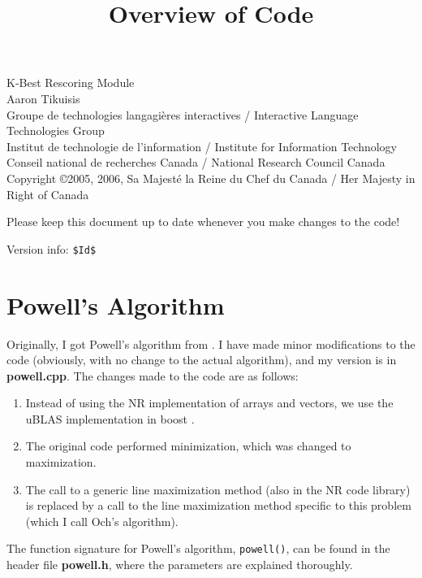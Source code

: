 \documentclass[12pt]{amsart}
\newcommand{\file}{\textbf} \newcommand{\url}{\underline}
\newcommand{\code}[1]{{\small \texttt{#1}}}
\begin{document}
\title{Overview of Code} \maketitle

{\tiny
  \noindent K-Best Rescoring Module\\ Aaron Tikuisis\\ Groupe de technologies
  langagi{\`e}res interactives / Interactive Language Technologies Group\\ Institut
  de technologie de l'information / Institute for Information Technology\\
  Conseil national de recherches Canada / National Research Council Canada\\
  Copyright \copyright 2005, 2006, Sa Majest{\'e} la Reine du Chef du Canada /
     Her Majesty in Right of Canada
}

\noindent
Please keep this document up to date whenever you make changes to the code!

{\tiny
\noindent
Version info: \verb+$Id$+
}
\\

\section*{Powell's Algorithm}

Originally, I got Powell's algorithm from \cite{NR-C++}.  I have made minor
modifications to the code (obviously, with no change to the actual algorithm),
and my version is in \file{powell.cpp}.  The changes made to the code are
as follows:

\begin{enumerate}
\item Instead of using the NR implementation of arrays and vectors, we use the
      uBLAS implementation in boost \cite{uBLAS}.

\item The original code performed minimization, which was changed to
      maximization.

\item The call to a generic line maximization method (also in the NR code
      library) is replaced by a call to the line maximization method specific
      to this problem (which I call Och's algorithm).
\end{enumerate}

The function signature for Powell's algorithm, \code{powell()}, can be found in
the header file \file{powell.h}, where the parameters are explained thoroughly.
\end{document}
